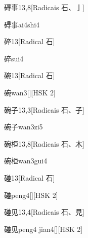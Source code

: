 \begin{entry}{碍事}{13,8}[Radicais ⽯、⼅]
  \begin{phonetics}{碍事}{ai4shi4}
  \end{phonetics}
\end{entry}

\begin{entry}{碎}{13}[Radical ⽯]
  \begin{phonetics}{碎}{sui4}
  \end{phonetics}
\end{entry}

\begin{entry}{碗}{13}[Radical ⽯]
  \begin{phonetics}{碗}{wan3}[][HSK 2]
  \end{phonetics}
\end{entry}

\begin{entry}{碗子}{13,3}[Radicais ⽯、⼦]
  \begin{phonetics}{碗子}{wan3zi5}
  \end{phonetics}
\end{entry}

\begin{entry}{碗柜}{13,8}[Radicais ⽯、⽊]
  \begin{phonetics}{碗柜}{wan3gui4}
  \end{phonetics}
\end{entry}

\begin{entry}{碰}{13}[Radical ⽯]
  \begin{phonetics}{碰}{peng4}[][HSK 2]
  \end{phonetics}
\end{entry}

\begin{entry}{碰见}{13,4}[Radicais ⽯、⾒]
  \begin{phonetics}{碰见}{peng4 jian4}[][HSK 2]
  \end{phonetics}
\end{entry}


